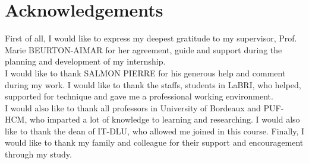 \chapter*{Acknowledgements}
\thispagestyle{empty}
\indent First of all, I would like to express my deepest gratitude to my supervisor, Prof. Marie BEURTON-AIMAR for her agreement, guide and support during the planning and development of my internship.\\[0.3cm]
I would like to thank SALMON PIERRE for his generous help and comment during my work. I would like to thank the staffs, students in LaBRI, who helped, supported for technique and gave me a professional working environment. 
\\[0.3cm]
I would also like to thank all professors in University of Bordeaux and PUF-HCM, who imparted a lot of knowledge to learning and researching. I would also like to thank the dean of IT-DLU, who allowed me joined in this course. 
Finally, I would like to thank my family and colleague for their support and encouragement through my study.
\clearpage